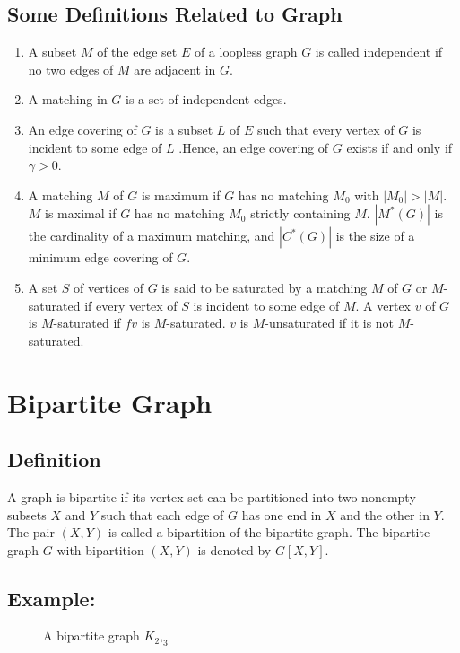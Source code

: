\documentclass[a4paper,12pt]{report}
\begin{document}
    	
    	\subsection*{Some Definitions Related to Graph}
    	\begin{enumerate}
    		\item A subset $M$ of the edge set $E$ of a loopless graph $G$ is called independent if no two edges of $M$ are adjacent in $G$.
    		
    		\item  A matching in $G$ is a set of independent edges.
    		 
    		\item An edge covering of $G$ is a subset $L$ of $E$ such that every vertex of $G$ is incident to some edge of $L$ .Hence, an edge covering of $G$ exists if and only if $\gamma > 0$.
    		
    		\item A matching $M$ of $G$ is maximum if $G$ has no matching $M_0$ with $|M_0| > |M|$. $M$ is maximal if $G$ has no matching $M_0$ strictly containing $M$. $|M^* (G)|$ is the cardinality of a maximum matching, and $|C^* (G)|$ is the size of a minimum edge covering of $G$.
    		
    		\item A set $S$ of vertices of $G$ is said to be saturated by a matching $M$ of $G$ or $M$-saturated if every vertex of $S$ is incident to some edge of $M$. A vertex $v$ of $G$ is $M$-saturated if $fv$ is $M$-saturated. $v$ is $M$-unsaturated if it is not $M$-saturated.
    	\end{enumerate}
    
    \section*{Bipartite Graph}
    \subsection*{Definition}
    A graph is bipartite if its vertex set can be partitioned into two nonempty subsets $X$ and $Y$ such that each edge of $G$ has one end in $X$ and the other in $Y$. The pair $(X, Y)$ is called a bipartition of the bipartite graph. The bipartite graph $G$ with bipartition $(X, Y)$ is denoted by $G[X, Y]$.
    \subsection*{Example:}
\begin{figure}[ht]
	\centering
\caption{A bipartite graph $K_2,_3$}
\end{figure}
     	
\end{document}
